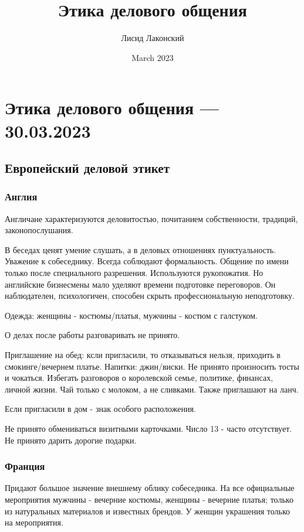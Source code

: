 \documentclass{article}
\title{Этика делового общения}
\author{Лисид Лаконский}
\date{March 2023}
\begin{document}
\raggedright

\maketitle
\tableofcontents
\pagebreak

\section{Этика делового общения — 30.03.2023}

\subsection{Европейский деловой этикет}

\subsubsection{Англия}

Англичане характеризуются деловитостью, почитанием собственности, традиций, законопослушания.

В беседах ценят умение слушать, а в деловых отношениях пунктуальность. Уважение к собеседнику. Всегда соблюдают формальность. Общение по имени только после специального разрешения. Используются рукопожатия. Но английские бизнесмены мало уделяют времени подготовке переговоров. Он наблюдателен, психологичен, способен скрыть профессиональную неподготовку.

Одежда: женщины - костюмы/платья, мужчины - костюм с галстуком.

О делах после работы разговаривать не принято.

Приглашение на обед: ксли пригласили, то отказываться нельзя, приходить в смокинге/вечернем платье. Напитки: джин/виски. Не принято произносить тосты и чокаться. Избегать разговоров о королевской семье, политике, финансах, личной жизни. Чай только с молоком, а не сливками. Также приглашают на ланч.

Если пригласили в дом - знак особого расположения.

Не принято обмениваться визитными карточками. Число 13 - часто отсутствует. Не принято дарить дорогие подарки.

\subsubsection{Франция}

Придают большое значение внешнему облику собеседника. На все официальные мероприятия мужчины - вечерние костюмы, женщины - вечерние платья; только из натуральных материалов и известных брендов. У женщин украшения только на мероприятия.
\end{document}
